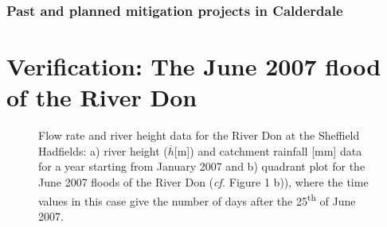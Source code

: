 \documentclass[11pt,a4paper]{article}
\begin{document}
\subsubsection{Past and planned mitigation projects in Calderdale}

\newpage
\section{Verification: The June 2007 flood of the River Don}
\begin{figure}[H]
\centering
{}
\hfill
{}
\caption{Flow rate and river height data for the River Don at the Sheffield Hadfields: a) river height ($\overline{h}$[m]) \cite{Calder-Don} and catchment rainfall [mm] data \cite{NRFA} for a year starting from January 2007 and b) quadrant plot for the June 2007 floods of the River Don (\textit{cf.} Figure 1 b)), where the time values in this case give the number of days after the 25\textsuperscript{th} of June 2007.}
\end{figure}
\end{document}
